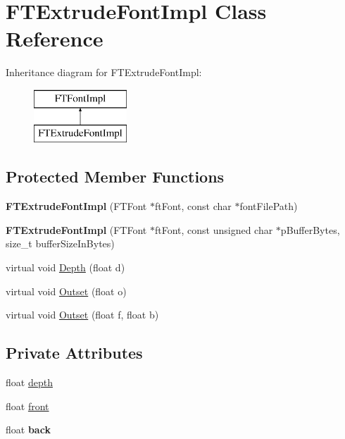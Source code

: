 \hypertarget{class_f_t_extrude_font_impl}{}\section{F\+T\+Extrude\+Font\+Impl Class Reference}
\label{class_f_t_extrude_font_impl}
Inheritance diagram for F\+T\+Extrude\+Font\+Impl\+:\begin{figure}[H]
\begin{center}
\leavevmode
\includegraphics[height=2.000000cm]{class_f_t_extrude_font_impl}
\end{center}
\end{figure}
\subsection*{Protected Member Functions}
\begin{DoxyCompactItemize}
\item 
{\bfseries F\+T\+Extrude\+Font\+Impl} (F\+T\+Font $\ast$ft\+Font, const char $\ast$font\+File\+Path)\hypertarget{class_f_t_extrude_font_impl_a43da54bf40a55db304395d8dec46897f}{}\label{class_f_t_extrude_font_impl_a43da54bf40a55db304395d8dec46897f}

\item 
{\bfseries F\+T\+Extrude\+Font\+Impl} (F\+T\+Font $\ast$ft\+Font, const unsigned char $\ast$p\+Buffer\+Bytes, size\+\_\+t buffer\+Size\+In\+Bytes)\hypertarget{class_f_t_extrude_font_impl_aa433e0addf2dba2ae9232d6522ccdb5f}{}\label{class_f_t_extrude_font_impl_aa433e0addf2dba2ae9232d6522ccdb5f}

\item 
virtual void \hyperlink{class_f_t_extrude_font_impl_a852e6d263a34982d56d19dfdf43722f0}{Depth} (float d)
\item 
virtual void \hyperlink{class_f_t_extrude_font_impl_a559ce64b4d0e881455b050d3be57cac0}{Outset} (float o)
\item 
virtual void \hyperlink{class_f_t_extrude_font_impl_a24e6ada58e9086284e99611454c7b335}{Outset} (float f, float b)
\end{DoxyCompactItemize}
\subsection*{Private Attributes}
\begin{DoxyCompactItemize}
\item 
float \hyperlink{class_f_t_extrude_font_impl_a89d73f2c624a1624770ab65a2adc37bc}{depth}
\item 
float \hyperlink{class_f_t_extrude_font_impl_a074ec35960eb5401384155803e9e7e5e}{front}
\item 
float {\bfseries back}\hypertarget{class_f_t_extrude_font_impl_ab1cbdc0312982b84403a7d859e683f2e}{}\label{class_f_t_extrude_font_impl_ab1cbdc0312982b84403a7d859e683f2e}

\end{DoxyCompactItemize}
